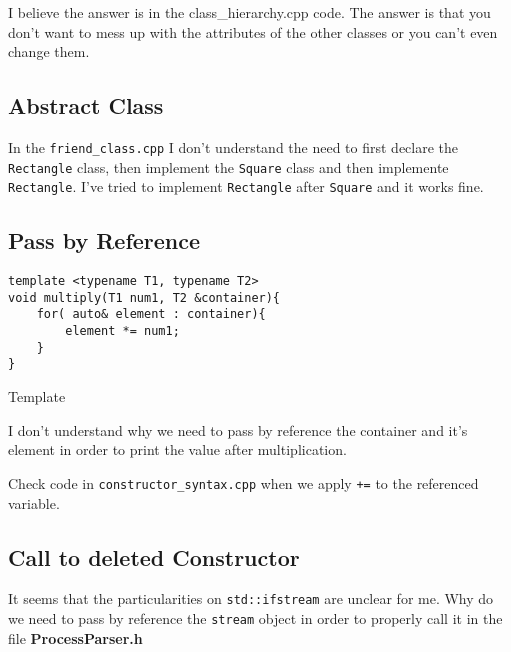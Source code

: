 \documentclass[11pt, a4paper]{article}
\begin{document}
I believe the answer is in the class\_hierarchy.cpp code. The answer is that you don't want to mess up with the attributes of the other classes or you can't even change them.



\subsection{Abstract Class}%
\label{sub:abstract_class}



In the \texttt{friend\_class.cpp} I don't understand the need to first declare the \texttt{Rectangle} class, then implement the \texttt{Square} class and then implemente \texttt{Rectangle}. I've tried to implement \texttt{Rectangle} after \texttt{Square} and it works fine.


\subsection{Pass by Reference}%
\label{sub:pass_by_reference}



\begin{listing}[hbt!]
\begin{verbatim}
template <typename T1, typename T2>
void multiply(T1 num1, T2 &container){
	for( auto& element : container){
		element *= num1;	
	}
}
\end{verbatim}
\caption{Template}
\label{lst:template}
\end{listing}

I don't understand why we need to pass by reference the container and it's element in order to print the value after multiplication.

Check code in \texttt{constructor\_syntax.cpp} when we apply \texttt{+=} to the referenced variable.



\subsection{Call to deleted Constructor}%
\label{sub:call_to_deleted_constructor}

It seems that the particularities on \texttt{std::ifstream} are unclear for me. Why do we need to pass by reference the \texttt{stream} object in order to properly call it in the file \textbf{ProcessParser.h}
\end{document}
